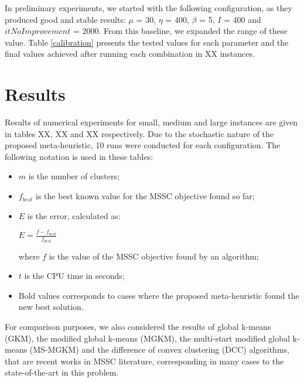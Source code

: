 In preliminary experiments, we started with the following configuration, as they produced good and stable results: $\mu$ = 30, $\eta$ = 400, $\beta$ = 5, $I$ = 400 and $itNoImprovement$ = 2000. From this baseline, we expanded the range of these value. Table \ref{calibration} presents the tested values for each parameter and the final values achieved after running each combination in XX instances.



\section{Results}
Results of numerical experiments for small, medium and large instances are given in tables XX, XX and XX respectively. Due to the stochastic nature of the proposed meta-heuristic, 10 runs were conducted for each configuration. The following notation is used in these tables:

\begin{itemize}

	\item $m$ is the number of clusters;

	\item $f_{best}$ is the best known value for the MSSC objective found so far;

	\item $E$ is the error, calculated as:

		\begin{center}
		\Large
			$E = \frac{f - f_{best}}{f_{best}}$
		\end{center}
		
	where $f$ is the value of the MSSC objective found by an algorithm;
	
	\item $t$ is the CPU time in seconds;

	\item Bold values corresponds to cases where the proposed meta-heuristic found the new best solution.

\end{itemize}

For comparison purposes, we also considered the results of global k-means (GKM), the modified global k-means (MGKM), the multi-start modified global k-means (MS-MGKM) and the difference of convex clustering (DCC) algorithms, that are recent works in MSSC literature, corresponding in many cases to the state-of-the-art in this problem.